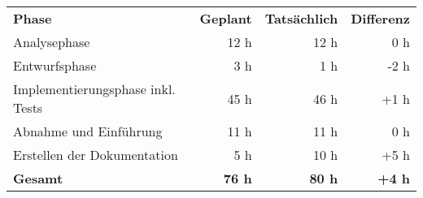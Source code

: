 \begin{tabular}{lrrr}
\rowcolor{heading}\textbf{Phase} & \textbf{Geplant} & \textbf{Tatsächlich} & \textbf{Differenz} \\
Analysephase & 12 h & 12 h & 0 h \\
\rowcolor{odd}Entwurfsphase & 3 h & 1 h & -2 h\\
Implementierungsphase inkl. Tests & 45 h & 46 h & +1 h\\
\rowcolor{odd}Abnahme und Einführung & 11 h & 11 h & 0 h \\
Erstellen der Dokumentation & 5 h & 10 h & +5 h\\
\hline
\hline
\rowcolor{odd}\textbf{Gesamt} & \textbf{76 h} & \textbf{80 h} & \textbf{+4 h}\\
\end{tabular}
